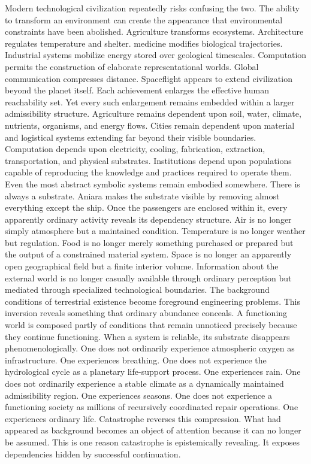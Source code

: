 \documentclass[11pt,oneside]{book}
\theoremstyle{definition}
\theoremstyle{remark}
\begin{document}
Modern technological civilization repeatedly risks confusing the two. The ability to transform an
environment can create the appearance that environmental constraints have been abolished.
Agriculture transforms ecosystems. Architecture regulates temperature and shelter. medicine modifies
biological trajectories. Industrial systems mobilize energy stored over geological timescales.
Computation permits the construction of elaborate representational worlds. Global communication
compresses distance. Spaceflight appears to extend civilization beyond the planet itself. Each
achievement enlarges the effective human reachability set. Yet every such enlargement remains
embedded within a larger admissibility structure. Agriculture remains dependent upon soil, water,
climate, nutrients, organisms, and energy flows. Cities remain dependent upon material and
logistical systems extending far beyond their visible boundaries. Computation depends upon
electricity, cooling, fabrication, extraction, transportation, and physical substrates. Institutions
depend upon populations capable of reproducing the knowledge and practices required to operate them.
Even the most abstract symbolic systems remain embodied somewhere. There is always a substrate.
Aniara makes the substrate visible by removing almost everything except the ship. Once the
passengers are enclosed within it, every apparently ordinary activity reveals its dependency
structure. Air is no longer simply atmosphere but a maintained condition. Temperature is no longer
weather but regulation. Food is no longer merely something purchased or prepared but the output of a
constrained material system. Space is no longer an apparently open geographical field but a finite
interior volume. Information about the external world is no longer casually available through
ordinary perception but mediated through specialized technological boundaries. The background
conditions of terrestrial existence become foreground engineering problems. This inversion reveals
something that ordinary abundance conceals. A functioning world is composed partly of conditions
that remain unnoticed precisely because they continue functioning. When a system is reliable, its
substrate disappears phenomenologically. One does not ordinarily experience atmospheric oxygen as
infrastructure. One experiences breathing. One does not experience the hydrological cycle as a
planetary life-support process. One experiences rain. One does not ordinarily experience a stable
climate as a dynamically maintained admissibility region. One experiences seasons. One does not
experience a functioning society as millions of recursively coordinated repair operations. One
experiences ordinary life. Catastrophe reverses this compression. What had appeared as background
becomes an object of attention because it can no longer be assumed. This is one reason catastrophe
is epistemically revealing. It exposes dependencies hidden by successful continuation.
\end{document}
